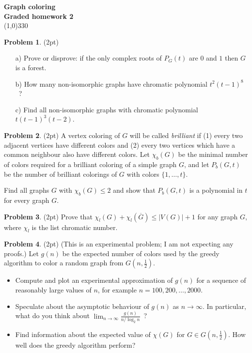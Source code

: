 \documentclass[a4paper]{article}
\theoremstyle{definition}
\newtheorem{myex}{Problem}
\begin{document}
\pagestyle{empty}
\begin{center}
	{\Large\bf Graph coloring}\\
	{\large\bf Graded homework 2}\\
	\line(1,0){330}
\end{center}



\begin{myex}(2pt)
\begin{itemize}
\item[a)] Prove or disprove: if the only complex roots of $P_G(t)$ are $0$ and $1$ then $G$ is a forest.
\item[b)] How many non-isomorphic graphs have chromatic polynomial $t^2(t-1)^8$\ ?
\item[c)] Find all non-isomorphic graphs with chromatic polynomial $t(t-1)^3(t-2)$.
\end{itemize}
\end{myex}

\begin{myex}(2pt)
A vertex coloring of $G$ will be called \emph{brilliant} if (1) every two adjacent vertices have different colors and (2) every two vertices which have a common neighbour also have different colors. Let $\chi_b(G)$ be the minimal number of colors required for a brilliant coloring of a simple graph $G$, and let $P_b(G,t)$ be the number of brilliant colorings of $G$ with colors $\{1,\ldots,t\}$. 

Find all graphs $G$ with $\chi_b(G)\leq 2$ and show that $P_b(G,t)$ is a polynomial in $t$ for every graph $G$.
\end{myex}

\begin{myex}(2pt)
Prove that $\chi_l(G)+\chi_l(\overline{G})\leq |V(G)|+1$ for any graph $G$, where $\chi_l$ is the list chromatic number.
\end{myex}

\begin{myex}(2pt)
(This is an experimental problem; I am not expecting any proofs.) Let $g(n)$ be the expected number of colors used by the greedy algorithm to color a random graph from $G(n,\frac12)$. 
\begin{itemize}
\item Compute and plot an experimental approximation of $g(n)$ for a sequence of reasonably large values of $n$, for example $n=100,200,\ldots,2000$.
\item Speculate about the asymptotic behaviour of $g(n)$ as $n\to\infty$. In particular, what do you think about $\lim_{n\to\infty}\frac{g(n)}{n/\log_2{n}}$\ ?
\item Find information about the expected value of $\chi(G)$ for $G\in G(n,\frac12)$. How well does the greedy algorithm perform?
\end{itemize}
\end{myex}
\end{document}
